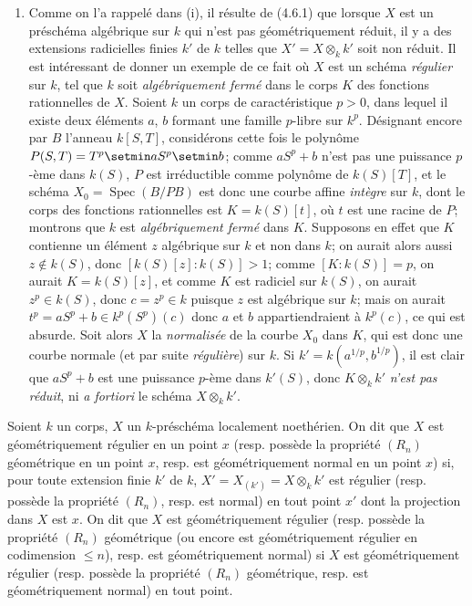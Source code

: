 \begin{remarks}[6.7.5]
\begin{enumerate}
\item[(ii)] Comme on l'a rappelé dans (i), il résulte de (4.6.1) que
lorsque $X$ est un préschéma algébrique sur $k$ qui n'est pas
géométriquement réduit, il y a des extensions radicielles finies $k'$ de
$k$ telles que $X'=X\otimes_k k'$ soit non réduit. Il est intéressant de
donner un exemple de ce fait où $X$ est un schéma \emph{régulier} sur $k$, tel
que $k$ soit \emph{algébriquement fermé} dans le corps $K$ des fonctions
rationnelles de $X$. Soient $k$ un corps de caractéristique $p>0$, dans
lequel il existe deux éléments $a$, $b$ formant une famille $p$-libre sur
$k^p$. Désignant encore par $B$ l'anneau $k[S,T]$, considérons cette fois
le polynôme $P(S,T)=T^p\setmin aS^p\setmin b$; comme $aS^p+b$ n'est pas une puissance
$p$-ème dans $k(S)$, $P$ est irréductible comme polynôme de $k(S)[T]$,
et le schéma $X_0=\operatorname{Spec}(B/PB)$ est donc une courbe affine
\emph{intègre} sur $k$, dont le corps des fonctions rationnelles est
$K=k(S)[t]$, où $t$ est une racine de $P$; montrons que $k$ est
\emph{algébriquement fermé} dans $K$. Supposons en effet que $K$ contienne un
élément $z$ algébrique sur $k$ et non dans $k$; on aurait alors aussi
$z\notin k(S)$, donc $[k(S)[z]:k(S)]>1$; comme $[K:k(S)]=p$, on aurait $K=k(S)[z]$, et comme $K$ est radiciel sur $k(S)$, on aurait
$z^p\in k(S)$, donc $c=z^p\in k$ puisque $z$ est algébrique sur $k$;
mais on aurait $t^p=aS^p+b\in k^p(S^p)(c)$ donc $a$ et $b$
appartiendraient à $k^p(c)$, ce qui est absurde. Soit alors $X$ la
\emph{normalisée} de la courbe $X_0$ dans $K$, qui est donc une courbe normale
(et par suite \emph{régulière}) sur $k$. Si $k'=k(a^{1/p},b^{1/p})$, il est
clair que $aS^p+b$ est une puissance $p$-ème dans $k'(S)$, donc
$K\otimes_k k'$ \emph{n'est pas réduit}, ni \emph{a fortiori} le schéma
$X\otimes_k k'$.
\end{enumerate}
\end{remarks}

\begin{definition}[6.7.6]
\label{IV.2.s6.7.6-fr}
Soient $k$ un corps, $X$ un $k$-préschéma localement noethérien. On dit
que $X$ est \textup{géométriquement régulier en un point $x$ (resp. possède la
propriété $(R_n)$ géométrique en un point $x$, resp. est géométriquement
normal en un point $x$)} si, pour toute extension finie $k'$ de $k$,
$X'=X_{(k')}=X\otimes_k k'$ est régulier \textup{(resp.} possède la propriété
$(R_n)$\textup{, resp.} est normal) en tout point $x'$ dont la projection dans
$X$ est $x$. On dit que $X$ est géométriquement régulier \textup{(resp.} possède
la propriété $(R_n)$ géométrique \textup{(ou encore} est géométriquement régulier
en codimension $\leqslant n$)\textup{, resp.} est géométriquement normal) si $X$
est géométriquement régulier \textup{(resp.} possède la propriété $(R_n)$
géométrique\textup{, resp.} est géométriquement normal) en tout point.
\end{definition}

